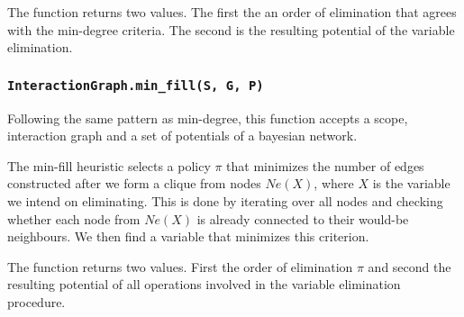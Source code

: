 \documentclass{amsart}
\theoremstyle{plain}
\newcommand{\code}[1]{\lstinline[mathescape=true]{#1}}
\begin{document}
The function returns two values. The first the an order of elimination that agrees with the
min-degree criteria. The second is the resulting potential of the variable elimination.

\subsubsection{\code{InteractionGraph.min_fill(S, G, P)}}

Following the same pattern as min-degree, this function accepts a scope, interaction graph and a
set of potentials of a bayesian network.

The min-fill heuristic selects a policy $\pi$ that minimizes the number of edges constructed after
we form a clique from nodes $Ne(X)$, where $X$ is the variable we intend on eliminating. This is
done by iterating over all nodes and checking whether each node from $Ne(X)$ is already connected
to their would-be neighbours. We then find a variable that minimizes this criterion.

The function returns two values. First the order of elimination $\pi$ and second the resulting
potential of all operations involved in the variable elimination procedure.

\newpage

\printbibliography[]
\end{document}
